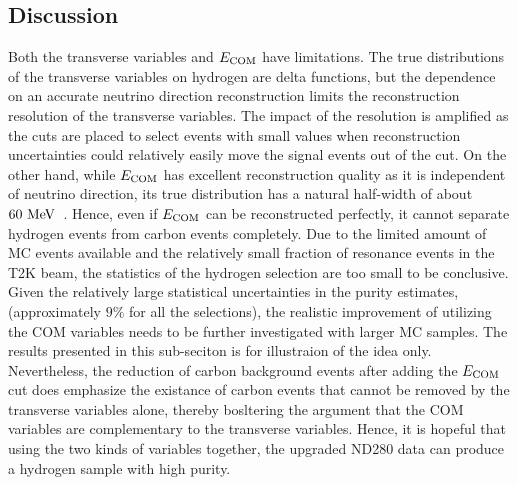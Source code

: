      \subsection{Discussion}
     Both the transverse variables and $E_{\textrm{COM}}$ have limitations.
     The true distributions of the transverse variables on hydrogen are delta functions, but the dependence on an accurate neutrino direction reconstruction limits the reconstruction resolution of the transverse variables.
     The impact of the resolution is amplified as the cuts are placed to select events with small values when reconstruction uncertainties could relatively easily move the signal events out of the cut.
     On the other hand, while $E_{\textrm{COM}}$ has excellent reconstruction quality as it is independent of neutrino direction, its true distribution has a natural half-width of about $60~\textrm{MeV}$~\cite{ParticleDataGroup:2024cfk}.
     Hence, even if $E_{\textrm{COM}}$ can be reconstructed perfectly, it cannot separate hydrogen events from carbon events completely.
     Due to the limited amount of MC events available and the relatively small fraction of resonance events in the T2K beam, the statistics of the hydrogen selection are too small to be conclusive.
     Given the relatively large statistical uncertainties in the purity estimates, (approximately $9\%$ for all the selections), the realistic improvement of utilizing the COM variables needs to be further investigated with larger MC samples.
     The results presented in this sub-seciton is for illustraion of the idea only.
     Nevertheless, the reduction of carbon background events after adding the $E_{\textrm{COM}}$ cut does emphasize the existance of carbon events that cannot be removed by the transverse variables alone, thereby bosltering the argument that the COM variables are complementary to the transverse variables.
     Hence, it is hopeful that using the two kinds of variables together, the upgraded ND280 data can produce a hydrogen sample with high purity.